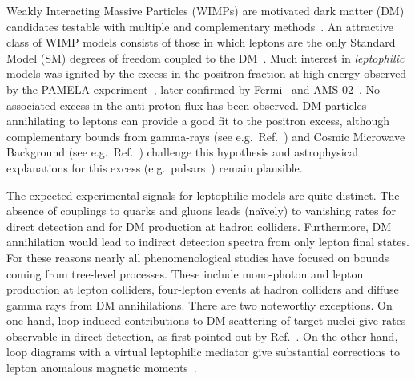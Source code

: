\documentclass[final,5p,twocolumn]{elsarticle}
\newcommand{\Ref}[1]{Ref.~\cite{#1}}
\begin{document}
Weakly Interacting Massive Particles (WIMPs) are motivated dark matter (DM) candidates testable with multiple and complementary methods~\cite{Jungman:1995df,Bertone:2004pz,Feng:2010gw}. An attractive class of WIMP models consists of those in which leptons are the only Standard Model (SM) degrees of freedom coupled to the DM~\cite{Fox:2008kb,Kopp:2009et,Bell:2014tta,Freitas:2014jla,delAguila:2014soa,Chen:2015tia}. Much interest in {\it leptophilic} models was ignited by the excess in the positron fraction at high energy observed by the  PAMELA experiment~\cite{Adriani:2008zr,Adriani:2013uda}, later confirmed by Fermi~\cite{FermiLAT:2011ab} and AMS-02~\cite{Aguilar:2013qda,Accardo:2014lma}. No associated excess in the anti-proton flux has been observed. DM particles annihilating to leptons can provide a good fit to the positron excess, although complementary bounds from gamma-rays (see e.g.~\Ref{Cirelli:2009dv,Meade:2009iu,FermiLAT:2012bf}) and Cosmic Microwave Background (see e.g.~\Ref{Madhavacheril:2013cna,Slatyer:2015jla}) challenge this hypothesis and astrophysical explanations for this excess (e.g.~pulsars~\cite{Hooper:2008kg,Profumo:2008ms,Feng:2015uta}) remain plausible. 


The expected experimental signals for leptophilic models are quite distinct. The absence of couplings to quarks and gluons leads (na\"ively) to vanishing rates for direct detection and for DM production at hadron colliders. Furthermore, DM annihilation would lead to indirect detection spectra from only lepton final states. For these reasons nearly all phenomenological studies have focused on bounds coming from tree-level processes. These include mono-photon and lepton production at lepton colliders, four-lepton events at hadron colliders and diffuse gamma rays from DM annihilations. There are two noteworthy exceptions. On one hand, loop-induced contributions to DM scattering of target nuclei give rates observable in direct detection, as first pointed out by \Ref{Kopp:2009et}. On the other hand, loop diagrams with a virtual leptophilic mediator give substantial corrections to lepton anomalous magnetic moments~\cite{Agrawal:2014ufa}.
\end{document}
